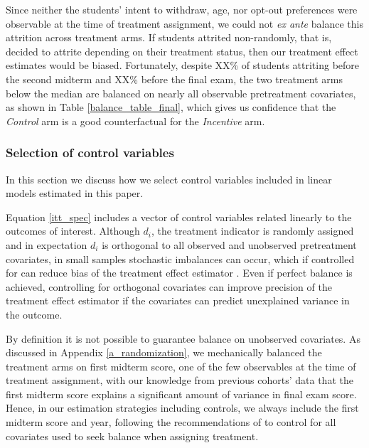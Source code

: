 \documentclass[12pt]{article}
\begin{document}
Since neither the students' intent to withdraw, age, nor opt-out preferences were observable at the time of treatment assignment, we could not \textit{ex ante} balance this attrition across treatment arms. If students attrited non-randomly, that is, decided to attrite depending on their treatment status, then our treatment effect estimates would be biased. Fortunately, despite XX\% of students attriting before the second midterm and XX\% before the final exam, the two treatment arms below the median are balanced on nearly all observable pretreatment covariates, as shown in Table \ref{balance_table_final}, which gives us confidence that the \textit{Control} arm is a good counterfactual for the \textit{Incentive} arm.

\subsubsection{Selection of control variables} \label{a_selection}

In this section we discuss how we select control variables included in linear models estimated in this paper.

Equation \ref{itt_spec} includes a vector of control variables related linearly to the outcomes of interest. Although $d_i$, the treatment indicator is randomly assigned and in expectation $d_i$ is orthogonal to all observed and unobserved pretreatment covariates, in small samples stochastic imbalances can occur, which if controlled for can reduce bias of the treatment effect estimator \parencite{ai2017}. Even if perfect balance is achieved, controlling for orthogonal covariates can improve precision of the treatment effect estimator if the covariates can predict unexplained variance in the outcome.

By definition it is not possible to guarantee balance on unobserved covariates. As discussed in Appendix \ref{a_randomization}, we mechanically balanced the treatment arms on first midterm score, one of the few observables at the time of treatment assignment, with our knowledge from previous cohorts' data that the first midterm score explains a significant amount of variance in final exam score. Hence, in our estimation strategies including controls, we always include the first midterm score and year, following the recommendations of \textcite{bm2009} to control for all covariates used to seek balance when assigning treatment.
\end{document}
